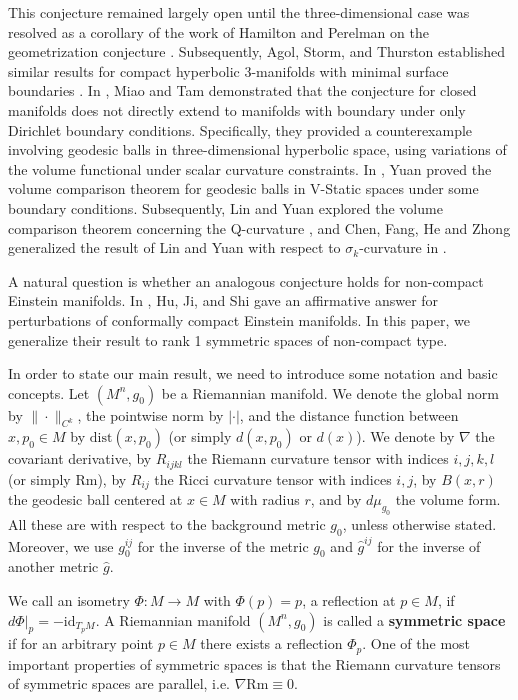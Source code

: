 \documentclass[12pt]{amsart}
\begin{document}
This conjecture remained largely open until the three-dimensional case was resolved as a corollary of the work of Hamilton and Perelman on the geometrization conjecture \cite{Pe2002, Pe2003}. Subsequently, Agol, Storm, and Thurston established similar results for compact hyperbolic 3-manifolds with minimal surface boundaries \cite{AST2007}. In \cite{MT2009}, Miao and Tam demonstrated that the conjecture for closed manifolds does not directly extend to manifolds with boundary under only Dirichlet boundary conditions. Specifically, they provided a counterexample involving geodesic balls in three-dimensional hyperbolic space, using variations of the volume functional under scalar curvature constraints. In \cite{Yu2023}, Yuan proved the volume comparison theorem for geodesic balls in V-Static spaces under some boundary conditions. Subsequently, Lin and Yuan explored the volume comparison theorem concerning the Q-curvature \cite{LY2016, LY2022}, and Chen, Fang, He and Zhong generalized the result of Lin and Yuan with respect to $\sigma_k$-curvature in \cite{CFHZ2025}.

A natural question is whether an analogous conjecture holds for non-compact Einstein manifolds. In \cite{HJS2016}, Hu, Ji, and Shi gave an affirmative answer for perturbations of conformally compact Einstein manifolds. In this paper, we generalize their result to rank 1 symmetric spaces of non-compact type. 

In order to state our main result, we need to introduce some notation and basic concepts. Let $(M^n, g_0)$ be a Riemannian manifold. We denote the global norm by $\| \cdot \|_{C^{k}}$, the pointwise norm by $| \cdot |$, and the distance function between $x, p_0\in M$ by $\mathrm{dist}(x, p_0)$ (or simply $d(x, p_0)$ or $d(x)$). We denote by $\nabla$ the covariant derivative, by $R_{ijkl}$ the Riemann curvature tensor with indices $i, j, k, l$ (or simply $\mathrm{Rm}$), by $R_{ij}$ the Ricci curvature tensor with indices $i, j$, by $B(x, r)$ the geodesic ball centered at $x\in M$ with radius $r$, and by $d\mu_{g_0}$ the volume form. All these are with respect to the background metric $g_0$, unless otherwise stated. Moreover, we use $g_{0}^{ij}$ for the inverse of the metric $g_0$ and $\hat{g}^{ij}$ for the inverse of another metric $\hat{g}$. 


We call an isometry $\Phi : M \rightarrow M$ with $\Phi(p)=p$, a reflection at $p\in M$, if $d \Phi|_{p}=-\mathrm{id}_{T_{p}M}$. A Riemannian manifold $(M^n, g_0)$ is called a \textbf{symmetric space} if for an arbitrary point $p\in M$ there exists a reflection $\Phi_p$. One of the most important properties of symmetric spaces is that the Riemann curvature tensors of symmetric spaces are parallel, i.e. $\nabla \mathrm{Rm} \equiv 0$. 
\end{document}
